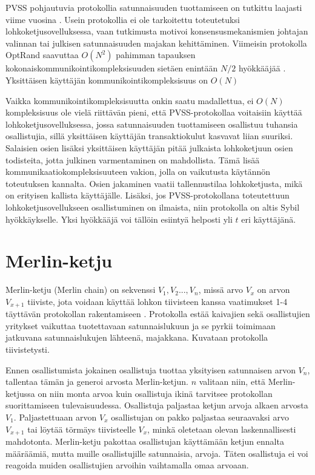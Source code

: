 PVSS pohjautuvia protokollia satunnaisuuden tuottamiseen on tutkittu laajasti viime vuosina \cite{bhat2022optrand, bhat2021randpiper, schindler_hydrand_2020, syta_scalable_2017} . Usein protokollia ei ole tarkoitettu toteutetuksi lohkoketjusovelluksessa, vaan tutkimusta motivoi konsensusmekanismien johtajan valinnan tai julkisen satunnaisuuden majakan kehittäminen. Viimeisin protokolla OptRand saavuttaa $O(N^2)$ pahimman tapauksen kokonaiskommunikointikompleksisuuden sietäen enintään $N/2$ hyökkääjää \cite{bhat2022optrand}. Yksittäisen käyttäjän kommunikointikompleksisuus on $O(N)$

Vaikka kommunikointikompleksisuutta onkin saatu madallettua, ei $O(N)$ kompleksisuus ole vielä riittävän pieni, että PVSS-protokollaa voitaisiin käyttää lohkoketjusovelluksessa, jossa satunnaisuuden tuottamiseen osallistuu tuhansia osallistujia, sillä yksittäisen käyttäjän transaktiokulut kasvavat liian suuriksi. Salaisien osien lisäksi yksittäisen käyttäjän pitää julkaista lohkoketjuun osien todisteita, jotta julkinen varmentaminen on mahdollista. Tämä lisää kommunikaatiokompleksisuuteen vakion, jolla on vaikutusta käytännön toteutuksen kannalta. Osien jakaminen vaatii tallennustilaa lohkoketjusta, mikä on erityisen kallista käyttäjälle. Lisäksi, jos PVSS-protokollana toteutettuun lohkoketjusovellukseen osallistuminen on ilmaista, niin protokolla on altis Sybil hyökkäykselle. Yksi hyökkääjä voi tällöin esiintyä helposti yli $t$ eri käyttäjänä.

\section{Merlin-ketju }

Merlin-ketju (Merlin chain) on sekvenssi $V_1, V_2 ... , V_n$, missä arvo $V_x$ on arvon $V_{x+1}$ tiiviste, jota voidaan käyttää lohkon tiivisteen kanssa vaatimukset 1-4 täyttävän protokollan rakentamiseen \cite{MerlinChains}. Protokolla estää kaivajien sekä osallistujien yritykset vaikuttaa tuotettavaan satunnaislukuun ja se pyrkii toimimaan jatkuvana satunnaislukujen lähteenä, majakkana. Kuvataan protokolla tiivistetysti.

Ennen osallistumista jokainen osallistuja tuottaa yksityisen satunnaisen arvon $V_n$, tallentaa tämän ja generoi arvosta Merlin-ketjun. $n$ valitaan niin, että Merlin-ketjussa on niin monta arvoa kuin osallistuja ikinä tarvitsee protokollan suorittamiseen tulevaisuudessa. Osallistuja paljastaa ketjun arvoja alkaen arvosta $V_1$. Paljastettuaan arvon $V_x$ osallistujan on pakko paljastaa seuraavaksi arvo $V_{x+1}$ tai löytää törmäys tiivisteelle $V_x$, minkä oletetaan olevan laskennallisesti mahdotonta. Merlin-ketju pakottaa osallistujan käyttämään ketjun ennalta määräämiä, mutta muille osallistujille satunnaisia, arvoja. Täten osallistuja ei voi reagoida muiden osallistujien arvoihin vaihtamalla omaa arvoaan.  

